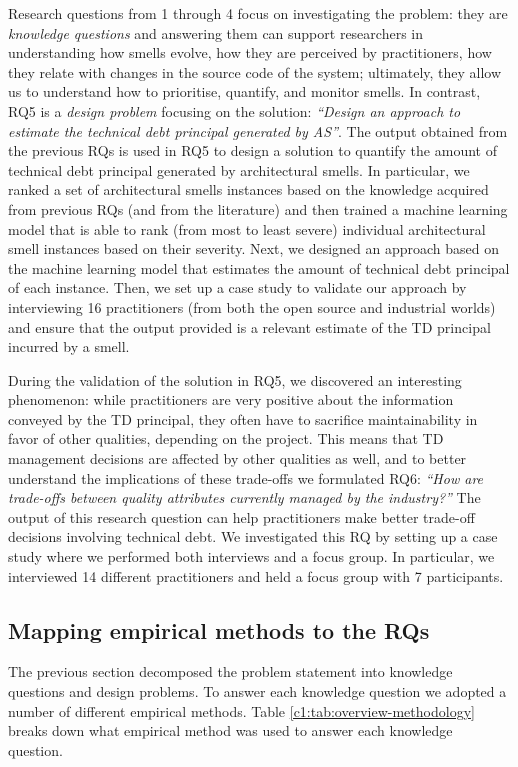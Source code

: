 Research questions from 1 through 4 focus on investigating the problem: they are \emph{knowledge questions} and answering them can support researchers in understanding how smells evolve, how they are perceived by practitioners, how they relate with changes in the source code of the system; ultimately, they allow us to understand how to prioritise, quantify, and monitor smells.
In contrast, RQ5 is a \emph{design problem} focusing on the solution: \textit{``Design an approach to estimate the technical debt principal generated by AS''}.
The output obtained from the previous RQs is used in RQ5 to design a solution to quantify the amount of technical debt principal generated by architectural smells.
In particular, we ranked a set of architectural smells instances based on the knowledge acquired from previous RQs (and from the literature) and then trained a machine learning model that is able to rank (from most to least severe) individual architectural smell instances based on their severity.
Next, we designed an approach based on the machine learning model that estimates the amount of technical debt principal of each instance.
Then, we set up a case study to validate our approach by interviewing 16 practitioners (from both the open source and industrial worlds) and ensure that the output provided is a relevant estimate of the TD principal incurred by a smell.

During the validation of the solution in RQ5, we discovered an interesting phenomenon: while practitioners are very positive about the information conveyed by the TD principal, they often have to sacrifice maintainability in favor of other qualities, depending on the project.
This means that TD management decisions are affected by other qualities as well, and to better understand the implications of these trade-offs we formulated RQ6: \textit{``How are trade-offs between quality attributes currently managed by the industry?''}
The output of this research question can help practitioners make better trade-off decisions involving technical debt.
We investigated this RQ by setting up a case study where we performed both interviews and a focus group.
In particular, we interviewed 14 different practitioners and held a focus group with 7 participants.


\subsection{Mapping empirical methods to the RQs}
The previous section decomposed the problem statement into knowledge questions and design problems.
To answer each knowledge question we adopted a number of different empirical methods.
Table \ref{c1:tab:overview-methodology} breaks down what empirical method was used to answer each knowledge question.

